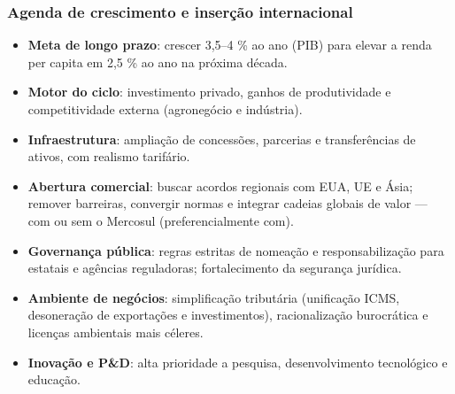 \documentclass[a4paper,12pt]{article}[abntex2]
\begin{document}
\subsubsection{\textbf{Agenda de crescimento e inserção internacional}}
\begin{itemize}
    \item \textbf{Meta de longo prazo}: crescer 3,5–4 \% ao ano (PIB) para elevar a renda per capita em 2,5 \% ao ano na próxima década.  
    \item \textbf{Motor do ciclo}: investimento privado, ganhos de produtividade e competitividade externa (agronegócio e indústria).  
    \item \textbf{Infraestrutura}: ampliação de concessões, parcerias e transferências de ativos, com realismo tarifário.  
    \item \textbf{Abertura comercial}: buscar acordos regionais com EUA, UE e Ásia; remover barreiras, convergir normas e integrar cadeias globais de valor — com ou sem o Mercosul (preferencialmente com).  
    \item \textbf{Governança pública}: regras estritas de nomeação e responsabilização para estatais e agências reguladoras; fortalecimento da segurança jurídica.  
    \item \textbf{Ambiente de negócios}: simplificação tributária (unificação ICMS, desoneração de exportações e investimentos), racionalização burocrática e licenças ambientais mais céleres.  
    \item \textbf{Inovação e P\&D}: alta prioridade a pesquisa, desenvolvimento tecnológico e educação.
\end{itemize}
\end{document}
